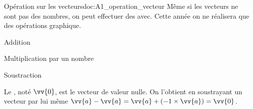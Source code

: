 \begin{doc}{Opération sur les vecteurs}{doc:A1_operation_vecteur}
  Même si les vecteurs ne sont pas des nombres, on peut effectuer des  avec.
  Cette année on ne réalisera que des opérations graphique.
  \begin{multicols}{3}
    \centering
    \begin{boite}
      \vAligne{50pt}
    \end{boite}
    Addition
    
    \begin{boite}
      \vAligne{50pt}
    \end{boite}
    Multiplication par un nombre

    \begin{boite}
      \vAligne{50pt}
    \end{boite}
    Soustraction
  \end{multicols}

  \begin{importants}
    Le , noté $\vv{0}$, est le vecteur de valeur nulle.
    On l'obtient en soustrayant un vecteur par lui même $\vv{a} - \vv{a} = \vv{a} + (-1 \times \vv{a}) = \vv{0}$.
  \end{importants}
\end{doc}
